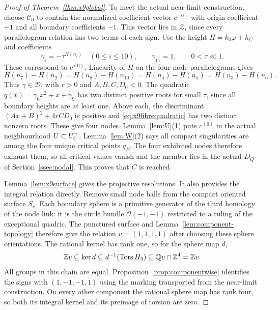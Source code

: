 \begin{proof}[Proof of Theorem~\ref{thm:x9global}]
To meet the actual near-limit construction, choose $\mathscr C_0$
to contain the normalized coefficient vector $c^{(0)}$ with origin
coefficient $+1$ and all boundary coefficients $-1$. This vector lies
in $\mathcal Z$, since every parallelogram relation has two terms of
each sign. Use the height $H=k_0\varphi+h_C$ and coefficients
\[
 \gamma_i=-\tau^{H(n_i)}\quad(0\le i\le10),\qquad
 \gamma_{11}=1,\qquad0<\tau\ll1.
\]
These correspond to $c^{(0)}$. Linearity of $H$ on the four node
parallelograms gives
\[
 H(n_7)-H(n_2)=H(n_8)-H(n_{10})
             =H(n_4)-H(n_5)=H(n_3)-H(n_6).
\]
Thus $\gamma\in\mathcal D$, with $r>0$ and $A,B,C,D_0<0$.
The quadratic $q(x)=\gamma_0x^2+x+\gamma_9$ has two distinct positive
roots for small $\tau$, since all boundary heights are at least one.
Above each, the discriminant $(Ax+B)^2+4rCD_0$ is positive and
\eqref{eq:x9fibrequadratic} has two distinct nonzero roots.
These give four nodes. Lemma~\ref{lem:U}(1) puts $c^{(0)}$ in the
actual neighbourhood $U\subset U^+_\mathbb C$. Lemma~\ref{lem:W}(2) says
all compact singularities are among the four
unique critical points $q_P$. The four exhibited nodes therefore
exhaust them, so all critical values vanish and the member lies in the
actual $D_Q$ of Section~\ref{ssec:nodal}. This proves that $C$ is reached.

Lemma~\ref{lem:x9surface} gives the projective resolutions. It also
provides the integral relation directly. Remove small node balls from
the compact oriented surface $S_r$. Each boundary sphere is a primitive
generator of the third homology of the node link: it is the circle bundle
$\mathcal O(-1,-1)$ restricted to a ruling of the exceptional quadric.
The punctured surface and Lemma~\ref{lem:component-topology} therefore
give the relation $v=(1,1,1,1)$ after choosing these sphere orientations.
The rational kernel has rank one, so for the sphere map $d$,
\[
 \mathbb Z v\subseteq\ker d\subseteq d^{-1}(\operatorname{Tors} H_3)
       \subseteq\mathbb Q v\cap\mathbb Z^4=\mathbb Z v.
\]
All groups in this chain are equal. Proposition~\ref{prop:componentwise}
identifies the signs with $(1,-1,-1,1)$ using the marking transported
from the near-limit construction. On every other component the rational
sphere map has rank four, so both its integral kernel and its preimage
of torsion are zero.
\end{proof}
